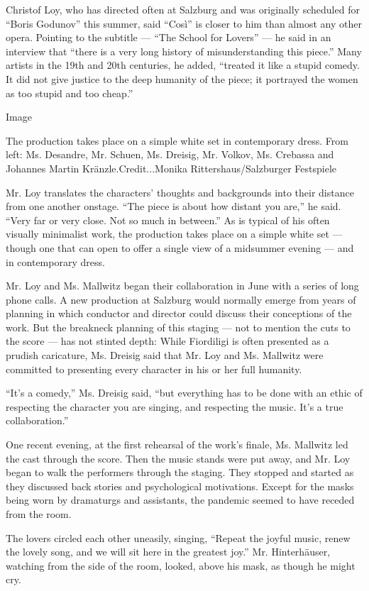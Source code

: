 Christof Loy, who has directed often at Salzburg and was originally
scheduled for ``Boris Godunov'' this summer, said ``Così'' is closer to
him than almost any other opera. Pointing to the subtitle --- ``The
School for Lovers'' --- he said in an interview that ``there is a very
long history of misunderstanding this piece.'' Many artists in the 19th
and 20th centuries, he added, ``treated it like a stupid comedy. It did
not give justice to the deep humanity of the piece; it portrayed the
women as too stupid and too cheap.''

Image

The production takes place on a simple white set in contemporary dress.
From left: Ms. Desandre, Mr. Schuen, Ms. Dreisig, Mr. Volkov, Ms.
Crebassa and Johannes Martin Kränzle.Credit...Monika
Rittershaus/Salzburger Festspiele

Mr. Loy translates the characters' thoughts and backgrounds into their
distance from one another onstage. ``The piece is about how distant you
are,'' he said. ``Very far or very close. Not so much in between.'' As
is typical of his often visually minimalist work, the production takes
place on a simple white set --- though one that can open to offer a
single view of a midsummer evening --- and in contemporary dress.

Mr. Loy and Ms. Mallwitz began their collaboration in June with a series
of long phone calls. A new production at Salzburg would normally emerge
from years of planning in which conductor and director could discuss
their conceptions of the work. But the breakneck planning of this
staging --- not to mention the cuts to the score --- has not stinted
depth: While Fiordiligi is often presented as a prudish caricature, Ms.
Dreisig said that Mr. Loy and Ms. Mallwitz were committed to presenting
every character in his or her full humanity.

``It's a comedy,'' Ms. Dreisig said, ``but everything has to be done
with an ethic of respecting the character you are singing, and
respecting the music. It's a true collaboration.''

One recent evening, at the first rehearsal of the work's finale, Ms.
Mallwitz led the cast through the score. Then the music stands were put
away, and Mr. Loy began to walk the performers through the staging. They
stopped and started as they discussed back stories and psychological
motivations. Except for the masks being worn by dramaturgs and
assistants, the pandemic seemed to have receded from the room.

The lovers circled each other uneasily, singing, ``Repeat the joyful
music, renew the lovely song, and we will sit here in the greatest
joy.'' Mr. Hinterhäuser, watching from the side of the room, looked,
above his mask, as though he might cry.

